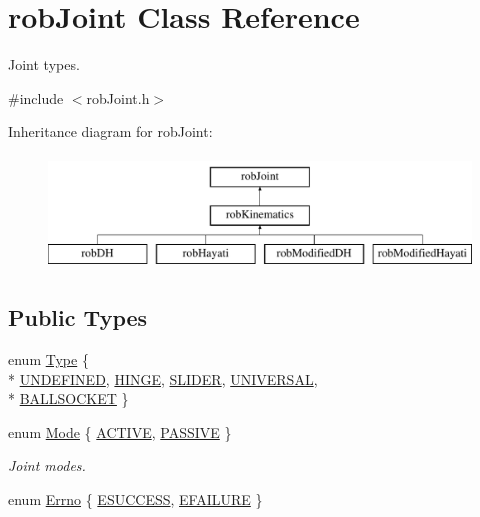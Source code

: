 \hypertarget{classrob_joint}{}\section{rob\+Joint Class Reference}
\label{classrob_joint}


Joint types.  




{\ttfamily \#include $<$rob\+Joint.\+h$>$}

Inheritance diagram for rob\+Joint\+:\begin{figure}[H]
\begin{center}
\leavevmode
\includegraphics[height=3.000000cm]{d7/dea/classrob_joint}
\end{center}
\end{figure}
\subsection*{Public Types}
\begin{DoxyCompactItemize}
\item 
enum \hyperlink{classrob_joint_a558d78a642cf2101aceddce0d82379b6}{Type} \{ \\*
\hyperlink{classrob_joint_a558d78a642cf2101aceddce0d82379b6add9f4c43ce1dafb01044505f9df11eca}{U\+N\+D\+E\+F\+I\+N\+E\+D}, 
\hyperlink{classrob_joint_a558d78a642cf2101aceddce0d82379b6a7578ac9af1fcd64d77cf815743c46f95}{H\+I\+N\+G\+E}, 
\hyperlink{classrob_joint_a558d78a642cf2101aceddce0d82379b6a1d096119f127eeb8b3ec24ffb082f159}{S\+L\+I\+D\+E\+R}, 
\hyperlink{classrob_joint_a558d78a642cf2101aceddce0d82379b6a2266ef9d7d2a68c670d13c965a1ac200}{U\+N\+I\+V\+E\+R\+S\+A\+L}, 
\\*
\hyperlink{classrob_joint_a558d78a642cf2101aceddce0d82379b6a0521bb3cbb35a846d24e72f580f12e55}{B\+A\+L\+L\+S\+O\+C\+K\+E\+T}
 \}
\item 
enum \hyperlink{classrob_joint_a7f77320bad87c259f71c18443f7bdd9c}{Mode} \{ \hyperlink{classrob_joint_a7f77320bad87c259f71c18443f7bdd9cad6aa8d614e974346d51e6545f7459858}{A\+C\+T\+I\+V\+E}, 
\hyperlink{classrob_joint_a7f77320bad87c259f71c18443f7bdd9caf79cc5b15a16d7c0393c1491b4222b31}{P\+A\+S\+S\+I\+V\+E}
 \}
\begin{DoxyCompactList}\small\item\em Joint modes. \end{DoxyCompactList}\item 
enum \hyperlink{classrob_joint_a6656cb0c2f8c9aadf0c446abd6bebed7}{Errno} \{ \hyperlink{classrob_joint_a6656cb0c2f8c9aadf0c446abd6bebed7a543dbf6fd076d13f978a7fd7429d9986}{E\+S\+U\+C\+C\+E\+S\+S}, 
\hyperlink{classrob_joint_a6656cb0c2f8c9aadf0c446abd6bebed7ae679e9dfdb01c1ca7309f37d7c790efa}{E\+F\+A\+I\+L\+U\+R\+E}
 \}
\end{DoxyCompactItemize}
